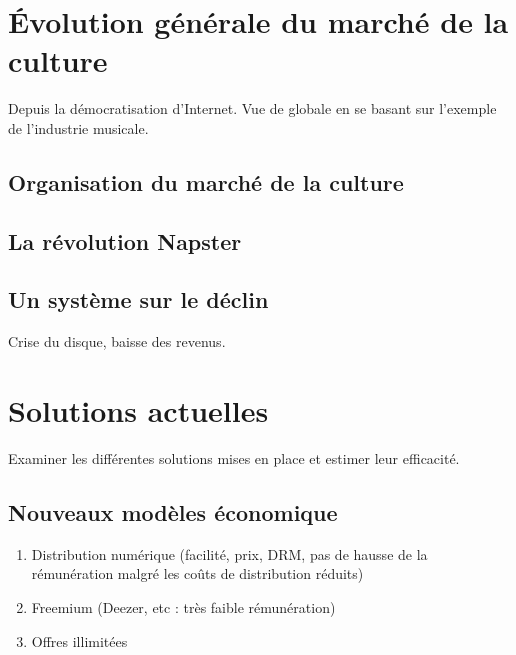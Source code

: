 \documentclass[a4paper]{report}
\begin{document}




	\chapter{Évolution générale du marché de la culture}
	Depuis la démocratisation d'Internet. Vue de globale en se basant sur l'exemple de l'industrie musicale.


	\section{Organisation du marché de la culture}


	\section{La révolution Napster}


	\section{Un système sur le déclin}
	Crise du disque, baisse des revenus.





	\chapter{Solutions actuelles}
	Examiner les différentes solutions mises en place et estimer leur efficacité.

	\section{Nouveaux modèles économique}
	\begin{enumerate}
		\item Distribution numérique (facilité, prix, DRM, pas de hausse de la rémunération malgré les coûts de distribution réduits)
		\item Freemium (Deezer, etc : très faible rémunération)
		\item Offres illimitées
	\end{enumerate}
\end{document}
